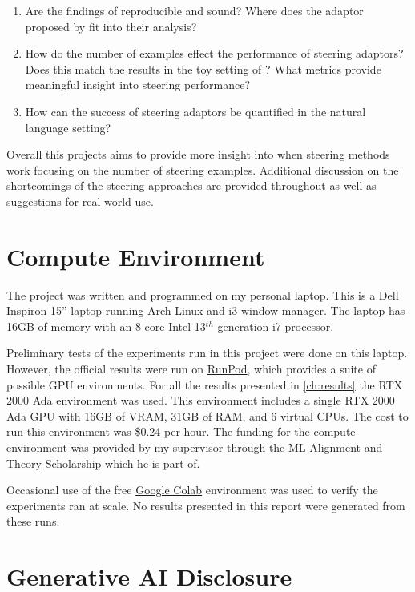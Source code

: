 \begin{enumerate}[nolistsep]
    \item Are the findings of \citet{steering-clear} reproducible and sound? Where does the adaptor proposed by \citet{ace} fit into their analysis?
    \item How do the number of examples effect the performance of steering adaptors? Does this match the results in the toy setting of \citet{steering-clear}? What metrics provide meaningful insight into steering performance?
    \item How can the success of steering adaptors be quantified in the natural language setting?
\end{enumerate}

Overall this projects aims to provide more insight into when steering methods work focusing on the number of steering examples.
Additional discussion on the shortcomings of the steering approaches are provided throughout as well as suggestions for real world use.

\section{Compute Environment}

The project was written and programmed on my personal laptop.
This is a Dell Inspiron 15'' laptop running Arch Linux and i3 window manager.
The laptop has 16GB of memory with an 8 core Intel 13$^{th}$ generation i7 processor.

Preliminary tests of the experiments run in this project were done on this laptop.
However, the official results were run on \href{https://www.runpod.io/}{RunPod}, which provides a suite of possible GPU environments.
For all the results presented in \cref{ch:results} the RTX 2000 Ada environment was used.
This environment includes a single RTX 2000 Ada GPU with 16GB of VRAM, 31GB of RAM, and 6 virtual CPUs.
The cost to run this environment was \$0.24 per hour.
The funding for the compute environment was provided by my supervisor through the \href{https://www.matsprogram.org/}{ML Alignment and Theory Scholarship} which he is part of.

Occasional use of the free \href{https://colab.research.google.com/}{Google Colab} environment was used to verify the experiments ran at scale.
No results presented in this report were generated from these runs.

\section{Generative AI Disclosure}

